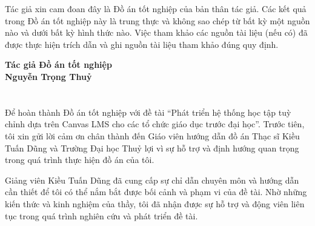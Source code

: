 \documentclass[a4paper,12pt,oneside]{report}
\title{\bf \TITLE}
\author{\AUTHOR}
\theoremstyle{definition}
\begin{document}
\restoregeometry

\restoregeometry

\newpage




\section*{}
\vspace{15pt}


Tác giả xin cam đoan đây là Đồ án tốt nghiệp của bản thân tác giả. Các kết quả trong Đồ án tốt nghiệp này là trung thực và không sao chép từ bất kỳ một nguồn nào và dưới bất kỳ hình thức nào. Việc tham khảo các nguồn tài liệu (nếu có) đã được thực hiện trích dẫn và ghi nguồn tài liệu tham khảo đúng quy định.
\begin{flushright}
  \textbf{Tác giả Đồ án tốt nghiệp}\\
  \vspace{2cm}
  \textbf{Nguyễn Trọng Thuỷ}
\end{flushright}

\pagestyle{empty} %

\newpage

\section*{}
\vspace{15pt}

Để hoàn thành Đồ án tốt nghiệp với đề tài “Phát triển hệ thống học tập tuỳ chỉnh dựa trên Canvas LMS cho các tổ chức giáo dục trước đại học”. Trước tiên, tôi xin gửi lời cảm ơn chân thành đến Giáo viên hướng dẫn đồ án Thạc sĩ Kiều Tuấn Dũng và Trường Đại học Thuỷ lợi vì sự hỗ trợ và định hướng quan trọng trong quá trình thực hiện đồ án của tôi.

Giảng viên Kiều Tuấn Dũng đã cung cấp sự chỉ dẫn chuyên môn và hướng dẫn cần thiết để tôi có thể nắm bắt được bối cảnh và phạm vi của đề tài. Nhờ những kiến thức và kinh nghiệm của thầy, tôi đã nhận được sự hỗ trợ và động viên liên tục trong quá trình nghiên cứu và phát triển đề tài.
\end{document}
